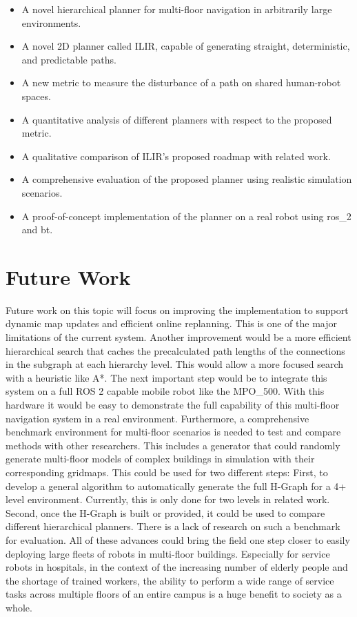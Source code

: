 \begin{itemize}
    \item A novel hierarchical planner for multi-floor navigation in arbitrarily large environments.
    \item A novel 2D planner called ILIR, capable of generating straight, deterministic, and predictable paths.
    \item A new metric to measure the disturbance of a path on shared human-robot spaces.
    \item A quantitative analysis of different planners with respect to the proposed metric.
    \item A qualitative comparison of ILIR's proposed roadmap with related work.
    \item A comprehensive evaluation of the proposed planner using realistic simulation scenarios.
    \item A proof-of-concept implementation of the planner on a real robot using \gls{ros_2} and \gls{bt}.
\end{itemize}

\section{Future Work}
\label{sec:future_work}
Future work on this topic will focus on improving the implementation to support dynamic map updates and efficient online replanning. This is one of the major limitations of the current system. Another improvement would be a more efficient hierarchical search that caches the precalculated path lengths of the connections in the subgraph at each hierarchy level. This would allow a more focused search with a heuristic like A*. The next important step would be to integrate this system on a full ROS 2 capable mobile robot like the MPO\_500. With this hardware it would be easy to demonstrate the full capability of this multi-floor navigation system in a real environment. Furthermore, a comprehensive benchmark environment for multi-floor scenarios is needed to test and compare methods with other researchers. This includes a generator that could randomly generate multi-floor models of complex buildings in simulation with their corresponding gridmaps. This could be used for two different steps: First, to develop a general algorithm to automatically generate the full H-Graph for a 4+ level environment. Currently, this is only done for two levels in related work. Second, once the H-Graph is built or provided, it could be used to compare different hierarchical planners. There is a lack of research on such a benchmark for evaluation. All of these advances could bring the field one step closer to easily deploying large fleets of robots in multi-floor buildings. Especially for service robots in hospitals, in the context of the increasing number of elderly people and the shortage of trained workers, the ability to perform a wide range of service tasks across multiple floors of an entire campus is a huge benefit to society as a whole.